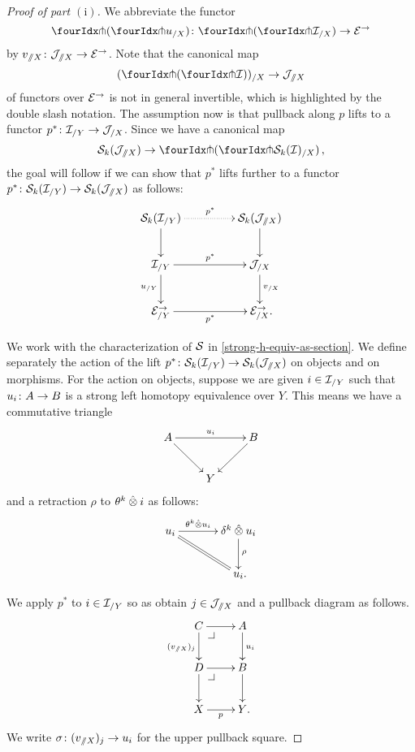\documentclass[reqno,10pt,a4paper,oneside,draft]{amsart}
\begin{document}
\begin{proof}[Proof of part $\mathrm{(i)}$]
We abbreviate the functor
\[
  \liftl{(\liftr{u_{/X}})} \co \liftl{(\liftr{\cal{I}_{/X}})} \to \catE^\to
\]
by $v_{\fakeslice X} \co \cal{J}_{\fakeslice X} \to \catE^\to$.
Note that the canonical map
\[
  (\liftl{(\liftr{\cal{I}})})_{/X} \to \cal{J}_{\fakeslice X}
\]
of functors over $\catE^\to$ is not in general invertible, which is highlighted by the double slash notation.
The assumption now is that pullback along $p$ lifts to a functor $p^* \co \cal{I}_{/Y} \to \cal{J}_{/X}$.
Since we have a canonical map
\[
  \cal{S}_k(\cal{J}_{\fakeslice X}) \to \liftl{(\liftr{\cal{S}_k(\cal{I})_{/X}})} \, ,
\]
the goal will follow if we can show that $p^*$ lifts further to a functor $p^* \co \cal{S}_k(\cal{I}_{/Y}) \to \cal{S}_k(\cal{J}_{\fakeslice X})$ as follows:
\[
\xymatrix@C+2em{
  \cal{S}_k(\cal{I}_{/Y})
  \ar@{.>}[r]^{p^*}
  \ar[d]
&
  \cal{S}_k(\cal{J}_{\fakeslice X})
  \ar[d]
\\
  \cal{I}_{/Y}
  \ar[r]^{p^*}
  \ar[d]_{u_{/Y}}
&
  \cal{J}_{/X}
  \ar[d]^{v_{/X}}
\\
  \catE_{/Y}^\to
  \ar[r]_{p^*}
&
  \catE_{/X}^\to
\rlap{.}}
\]

We work with the characterization of $\cal{S}$ in \cref{strong-h-equiv-as-section}.
We define separately the action of the lift $p^* \co \cal{S}_k(\cal{I}_{/Y}) \to \cal{S}_k(\cal{J}_{\fakeslice X})$ on objects and on morphisms.
For the action on objects, suppose we are given $i \in \cal{I}_{/Y}$ such that $u_i \co A \to B$ is a strong left homotopy equivalence over $Y$.
This means we have a commutative triangle
\[
\xymatrix{
  A
  \ar[rr]^{u_i}
  \ar[dr]
&&
  B
  \ar[dl]
\\&
  Y
}
\]
and a retraction $\rho$ to $\thetak \hatotimes i$ as follows:
\[
\xymatrix@C+1em{
  u_i
  \ar[r]^-{\thetak \hatotimes u_i}
  \ar@{=}[dr]
&
  \kcyl \hatotimes u_i \ar[d]^{\rho}
\\&
  u_i
\rlap{.}}
\]

We apply $p^*$ to $i \in \cal{I}_{/Y}$ so as obtain $j \in \cal{J}_{\fakeslice X}$ and a pullback diagram as follows.
\begin{equation} \label{technical:0}
\xycenter{
  C
  \ar[r]
  \ar[d]_{(v_{\fakeslice X})_j}
  \pullback{dr}
&
  A
  \ar[d]^{u_i}
\\
  D
  \ar[r]
  \ar[d]
  \pullback{dr}
&
  B
  \ar[d]
\\
  X
  \ar[r]_p
&
  Y
\rlap{.}}
\end{equation}
We write $\sigma \co (v_{\fakeslice X})_j \to u_i$ for the upper pullback square.


\end{proof}
\end{document}
